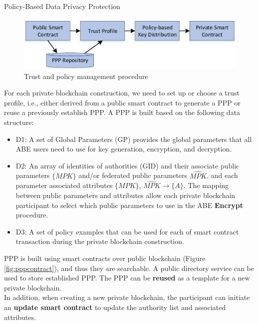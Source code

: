 \documentclass[11pt]{beamer}
\begin{document}
\begin{frame}[allowframebreaks]{Policy-Based Data Privacy Protection}

\begin{figure}
\includegraphics[scale=0.3]{pppdataprotection.png}
\caption{Trust and policy management procedure}
\label{ppptrustpolicy}
\end{figure}

For each private blockchain construction, we need to set up or choose a trust profile, i.e., either derived from a public smart contract to generate a PPP or reuse a previously establish PPP.
\framebreak
A PPP is built based on the following data structure:
\begin{itemize}
\item D1: A set of Global Parameters (GP) provides the global parameters that all ABE users need to use for key generation, encryption, and decryption.
\item D2: An array of identities of authorities ({GID}) and their associate public parameters $\{MPK\}$ and/or federated public parameters $\hat{MPK}$, and each parameter associated attributes $\{MPK\}$, $\hat{MPK} \rightarrow \{A\}$. The mapping between public parameters and attributes allow each private blockchain participant to select which public parameters to use in the ABE \textbf{Encrypt} procedure.
\item D3: A set of policy examples that can be used for each of smart contract transaction during the private blockchain construction.

\end{itemize}

PPP is built using smart contracts over public blockchain (Figure \ref{fig:pppcontract}), and thus they are searchable. A public directory service can be used to store established PPP. The PPP can be \textbf{reused} as a template for a new private blockchain.\\
In addition, when creating a new private blockchain, the participant can initiate an \textbf{update smart contract} to update the authority list and associated attributes.

\end{frame}
\end{document}
